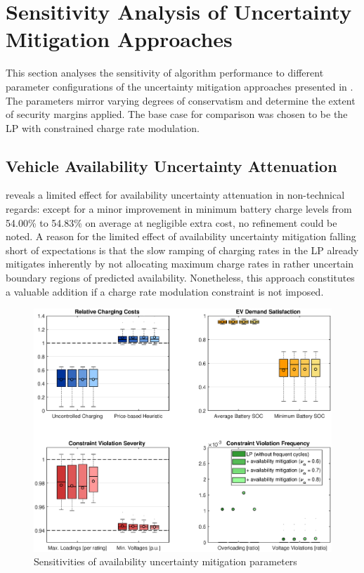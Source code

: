 \section{Sensitivity Analysis of Uncertainty Mitigation Approaches}
\label{sec:saunc}

This section analyses the sensitivity of algorithm performance to different parameter configurations of the uncertainty mitigation approaches presented in . The parameters mirror varying degrees of conservatism and determine the extent of security margins applied. The base case for comparison was chosen to be the LP with constrained charge rate modulation.

\subsection{Vehicle Availability Uncertainty Attenuation}

 reveals a limited effect for availability uncertainty attenuation in non-technical regards: except for a minor improvement in minimum battery charge levels from 54.00\% to 54.83\% on average at negligible extra cost, no refinement could be noted. A reason for the limited effect of availability uncertainty mitigation falling short of expectations is that the slow ramping of charging rates in the LP already mitigates inherently by not allocating maximum charge rates in rather uncertain boundary regions of predicted availability. Nonetheless, this approach constitutes a valuable addition if a charge rate modulation constraint is not imposed. %

\begin{figure}[]
	\includegraphics[width=\textwidth,trim={2.9cm 1.5cm 2.5cm 0cm},clip]{figures/evaluation/lp_av.eps}
	\caption{Sensitivities of availability uncertainty mitigation parameters}
	\label{fig:lpav}
\end{figure}

